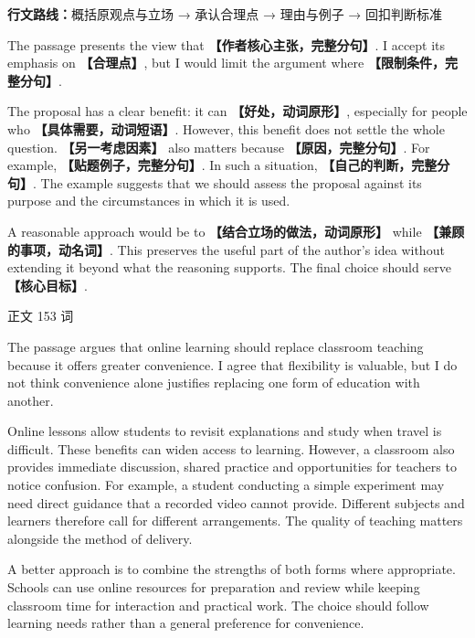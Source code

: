 \documentclass[11pt,a4paper,fontset=macnew]{ctexart}
\newenvironment{writing}{\begingroup\fontsize{10.5}{13.5}\selectfont\setlength{\parskip}{3pt}}{\par\endgroup}
\newenvironment{example}{\begingroup\fontsize{11}{14.3}\selectfont\setlength{\parskip}{4pt}}{\par\endgroup}
\begin{document}
{\small\textbf{行文路线：}概括原观点与立场 → 承认合理点 → 理由与例子 → 回扣判断标准}\par
\par\vspace{4pt}{\bfseries 可替换模板}\par\nopagebreak
\begin{writing}
The passage presents the view that {\bfseries 【作者核心主张，完整分句】}. I accept its emphasis on {\bfseries 【合理点】}, but I would limit the argument where {\bfseries 【限制条件，完整分句】}.

The proposal has a clear benefit: it can {\bfseries 【好处，动词原形】}, especially for people who {\bfseries 【具体需要，动词短语】}. However, this benefit does not settle the whole question. {\bfseries 【另一考虑因素】} also matters because {\bfseries 【原因，完整分句】}. For example, {\bfseries 【贴题例子，完整分句】}. In such a situation, {\bfseries 【自己的判断，完整分句】}. The example suggests that we should assess the proposal against its purpose and the circumstances in which it is used.

A reasonable approach would be to {\bfseries 【结合立场的做法，动词原形】} while {\bfseries 【兼顾的事项，动名词】}. This preserves the useful part of the author's idea without extending it beyond what the reasoning supports. The final choice should serve {\bfseries 【核心目标】}.

\end{writing}
\par\vspace{4pt}{\bfseries 完整套用示例}\par\nopagebreak
{\small 正文 153 词}\par
\begin{example}
The passage argues that online learning should replace classroom teaching because it offers greater convenience. I agree that flexibility is valuable, but I do not think convenience alone justifies replacing one form of education with another.

Online lessons allow students to revisit explanations and study when travel is difficult. These benefits can widen access to learning. However, a classroom also provides immediate discussion, shared practice and opportunities for teachers to notice confusion. For example, a student conducting a simple experiment may need direct guidance that a recorded video cannot provide. Different subjects and learners therefore call for different arrangements. The quality of teaching matters alongside the method of delivery.

A better approach is to combine the strengths of both forms where appropriate. Schools can use online resources for preparation and review while keeping classroom time for interaction and practical work. The choice should follow learning needs rather than a general preference for convenience.

\end{example}
\end{document}
